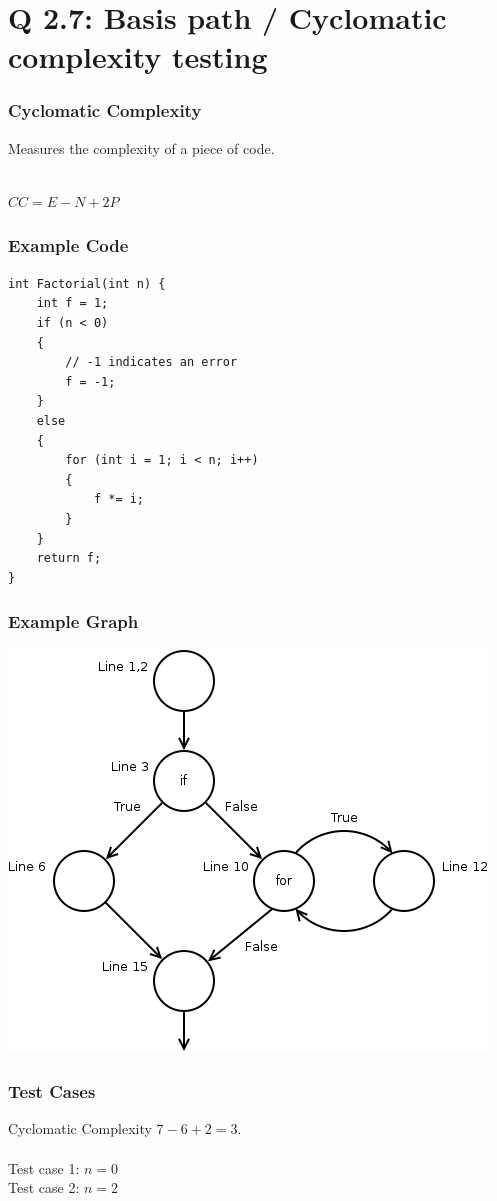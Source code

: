 
\section{Q 2.7: Basis path / Cyclomatic complexity testing}

\begin{frame}
    \frametitle{Cyclomatic Complexity}
    Measures the complexity of a piece of code.\\~\\

    \begin{center}
        $CC = E-N+2P$
    \end{center}
\end{frame}

\begin{frame}[fragile]
    \frametitle{Example Code}
    \begin{verbatim}
int Factorial(int n) {
    int f = 1;
    if (n < 0)
    {
        // -1 indicates an error
        f = -1;
    }
    else
    {
        for (int i = 1; i < n; i++)
        {
            f *= i;
        }
    }
    return f;
}
    \end{verbatim}
\end{frame}

\begin{frame}
    \frametitle{Example Graph}
    \centering
    \includegraphics[scale=0.4]{state_transition.png}
\end{frame}

\begin{frame}
    \frametitle{Test Cases}
    Cyclomatic Complexity $7-6+2=3$.\\~\\
    Test case 1: $n=0$\\
    Test case 2: $n=2$\\
\end{frame}



